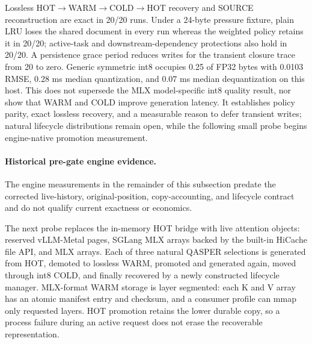 \documentclass[11pt]{article}
\begin{document}
Lossless HOT$\rightarrow$WARM$\rightarrow$COLD$\rightarrow$HOT recovery and
SOURCE reconstruction are exact in 20/20 runs. Under a 24-byte pressure
fixture, plain LRU loses the shared document in every run whereas the weighted
policy retains it in 20/20; active-task and downstream-dependency protections
also hold in 20/20. A persistence grace period reduces writes for the transient
closure trace from 20 to zero. Generic symmetric int8 occupies 0.25 of FP32
bytes with 0.0103 RMSE, 0.28 ms median quantization, and 0.07 ms median
dequantization on this host. This does not supersede the MLX model-specific
int8 quality result, nor show that WARM and COLD improve generation latency.
It establishes policy parity, exact lossless recovery, and a measurable reason
to defer transient writes; natural lifecycle distributions remain open, while
the following small probe begins engine-native promotion measurement.

\paragraph{Historical pre-gate engine evidence.}
The engine measurements in the remainder of this subsection predate the
corrected live-history, original-position, copy-accounting, and lifecycle
contract and do not qualify current exactness or economics.

The next probe replaces the in-memory HOT bridge with live attention objects:
reserved vLLM-Metal pages, SGLang MLX arrays backed by the built-in HiCache
file API, and MLX arrays. Each of three natural QASPER selections is generated
from HOT, demoted to lossless WARM, promoted and generated again, moved through
int8 COLD, and finally recovered by a newly constructed lifecycle manager.
MLX-format WARM storage is layer segmented: each K and V array has an atomic
manifest entry and checksum, and a consumer profile can mmap only requested
layers. HOT promotion retains the lower durable copy, so a process failure
during an active request does not erase the recoverable representation.

\begin{table}[H]
\centering
\small
\caption{Three-example live-engine storage mechanism probe. Ratios include
request-time promotion and generation but exclude background demotion and COLD
conversion. Prefix is the mean common HOT/int8 output prefix in tokens.}
\resizebox{\linewidth}{!}{%
}
\label{tab:live-storage-lifecycle}
\end{table}
\end{document}
